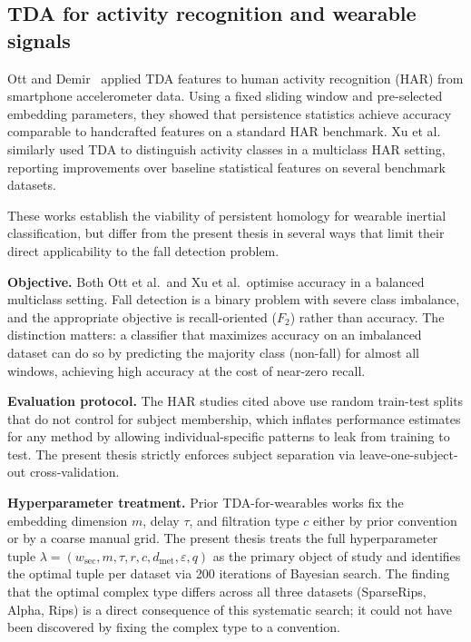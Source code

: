 \subsection{TDA for activity recognition and wearable signals}

Ott and Demir~\parencite{ott2017topological} applied TDA features to human activity
recognition (HAR) from smartphone accelerometer data.  Using a fixed sliding window
and pre-selected embedding parameters, they showed that persistence statistics
achieve accuracy comparable to handcrafted features on a standard HAR benchmark.
Xu et al.~\parencite{xu2019topological} similarly used TDA to distinguish activity classes
in a multiclass HAR setting, reporting improvements over baseline statistical
features on several benchmark datasets.

These works establish the viability of persistent homology for wearable inertial
classification, but differ from the present thesis in several ways that limit their
direct applicability to the fall detection problem.

\textbf{Objective.}  Both Ott et al.\ and Xu et al.\ optimise accuracy in a balanced
multiclass setting.  Fall detection is a binary problem with severe class imbalance,
and the appropriate objective is recall-oriented ($F_2$) rather than accuracy.
The distinction matters: a classifier that maximizes accuracy on an imbalanced dataset
can do so by predicting the majority class (non-fall) for almost all windows, achieving
high accuracy at the cost of near-zero recall.

\textbf{Evaluation protocol.}  The HAR studies cited above use random train-test
splits that do not control for subject membership, which inflates performance
estimates for any method by allowing individual-specific patterns to leak from
training to test.  The present thesis strictly enforces subject separation via
leave-one-subject-out cross-validation.

\textbf{Hyperparameter treatment.}  Prior TDA-for-wearables works fix the embedding
dimension $m$, delay $\tau$, and filtration type $c$ either by prior convention or
by a coarse manual grid.  The present thesis treats the full hyperparameter tuple
$\lambda=(w_\mathrm{sec}, m, \tau, r, c, d_\mathrm{met}, \varepsilon, q)$ as the
primary object of study and identifies the optimal tuple per dataset via 200
iterations of Bayesian search.  The finding that the optimal complex type differs
across all three datasets (SparseRips, Alpha, Rips) is a direct consequence of this
systematic search; it could not have been discovered by fixing the complex type to a
convention.


